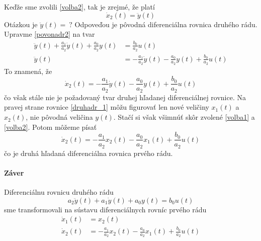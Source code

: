 \documentclass[a4paper, 10pt, ]{article}
\begin{document}
Keďže sme zvolili \eqref{volba2}, tak je zrejmé, že platí
\begin{equation} 
    \dot x_2(t) = \ddot y(t)
\end{equation}
Otázkou je $\ddot y(t) = \ ?$ Odpoveďou je pôvodná diferenciálna rovnica druhého rádu. Upravme \eqref{povonadr2} na tvar
\begin{align}
     \ddot y(t) + \frac{a_1}{a_2} \dot y(t) + \frac{a_0}{a_2} y(t) &= \frac{b_0}{a_2} u(t) \\
     \ddot y(t) &= - \frac{a_1}{a_2} \dot y(t) - \frac{a_0}{a_2} y(t) +  \frac{b_0}{a_2} u(t) 
\end{align}
To znamená, že
\begin{equation}  \label{druhadr_1}
    \dot x_2(t) = - \frac{a_1}{a_2} \dot y(t) - \frac{a_0}{a_2} y(t) +  \frac{b_0}{a_2} u(t) 
\end{equation}
čo však stále nie je požadovaný tvar druhej hľadanej diferenciálnej rovnice. Na pravej strane rovnice \eqref{druhadr_1} môžu figurovať len nové veličiny $x_1(t)$ a $x_2(t)$, nie pôvodná veličina $y(t)$. Stačí si však všimnúť skôr zvolené \eqref{volba1} a \eqref{volba2}. Potom môžeme písať
\begin{equation}  \label{druhadr_2}
    \dot x_2(t) = - \frac{a_1}{a_2}  x_2(t) - \frac{a_0}{a_2} x_1(t) +  \frac{b_0}{a_2} u(t) 
\end{equation}
čo je druhá hľadaná diferenciálna rovnica prvého rádu.





\paragraph{Záver}

Diferenciálnu rovnicu druhého rádu
\begin{equation} 
    a_2 \ddot y(t) + a_1 \dot y(t) + a_0 y(t) = b_0 u(t)
\end{equation}
sme transformovali na sústavu diferenciálnych rovníc prvého rádu
\begin{align}
    \dot x_1(t) &= x_2(t) \\
    \dot x_2(t) &= - \frac{a_1}{a_2}  x_2(t) - \frac{a_0}{a_2} x_1(t) +  \frac{b_0}{a_2} u(t) 
\end{align}












\end{document}
